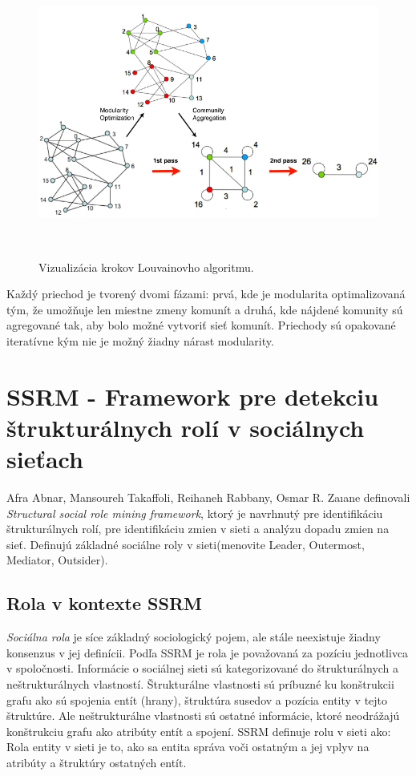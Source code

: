 \documentclass[slovak,master,public,dept460,male,cpdeclaration,oneside]{diploma}
\begin{document}
\begin{figure}[H]
\centering
\includegraphics[width=14.5cm, height=9.5cm]{figures/louvain}
\caption{Vizualizácia krokov Louvainovho algoritmu. }
\end{figure}

Každý priechod je tvorený dvomi fázami: prvá, kde je modularita optimalizovaná tým, že umožňuje len miestne zmeny komunít a druhá, kde nájdené komunity sú agregované tak, aby bolo možné vytvoriť sieť komunít. Priechody sú opakované iteratívne kým nie je možný žiadny nárast modularity.

\newpage



\section{SSRM - Framework pre detekciu štrukturálnych rolí v sociálnych sieťach}

Afra Abnar, Mansoureh Takaffoli, Reihaneh Rabbany, Osmar R. Zaıane \cite{9} definovali \textit{Structural social role mining framework}, ktorý je navrhnutý pre identifikáciu štrukturálnych rolí, pre identifikáciu zmien v sieti a analýzu dopadu zmien na sieť. Definujú základné sociálne roly v sieti(menovite Leader, Outermost, Mediator, Outsider). 

\subsection{Rola v kontexte SSRM}
\textit{Sociálna rola} je síce základný sociologický pojem, ale stále neexistuje žiadny konsenzus v jej definícii. Podľa SSRM je rola je považovaná za pozíciu jednotlivca v spoločnosti.
 Informácie o sociálnej sieti sú kategorizované do štrukturálnych a neštrukturálnych vlastností. Štrukturálne vlastnosti sú príbuzné ku konštrukcii grafu ako sú spojenia entít (hrany), štruktúra susedov a pozícia entity v tejto štruktúre. Ale neštrukturálne vlastnosti sú ostatné informácie, ktoré neodrážajú konštrukciu grafu ako atribúty entít a spojení. SSRM definuje rolu v sieti ako: Rola entity v sieti je to, ako sa entita správa voči ostatným a jej vplyv na atribúty a štruktúry ostatných entít.
\end{document}
